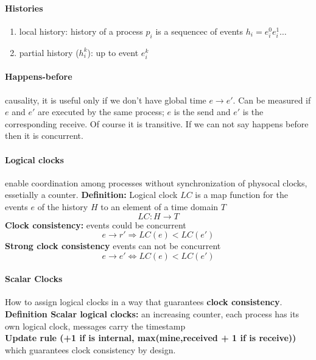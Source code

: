 \documentclass[11pt]{article}
\begin{document}
\paragraph{Histories} %
\label{par:histories}
\begin{enumerate}
	\item local history: history of a process $p_i$ is a sequencec of events $h_i = e^0_i e^1_i\ldots$
	\item partial history ($h^k_i$): up to event $e^{k}_{i}$
\end{enumerate}

\paragraph{Happens-before} %
\label{par:happens_before}
causality, it is useful only if we don't have global time $e \rightarrow e'$. Can be measured if $e$ and $e'$ are executed by the same process; $e$ is the send and $e'$ is the corresponding receive. Of course it is transitive. If we can not say happens before then it is concurrent.

\paragraph{Logical clocks} %
\label{par:logical_clocks}
enable coordination among processes without synchronization of physocal clocks, essetially a counter.
\textbf{Definition:} Logical clock $LC$ is a map function for the events $e$ of the history $H$ to an element of a time domain $T$
\[
	LC : H \rightarrow T
\]
\textbf{Clock consistency:} events could be concurrent\[
	e \rightarrow r' \Rightarrow LC(e) < LC(e')
\]
\textbf{Strong clock consistency} events can not be concurrent\[
	e \rightarrow e' \Leftrightarrow LC(e) < LC(e')
\]

\paragraph{Scalar Clocks} %
\label{par:scalar_clocks}
How to assign logical clocks in a way that guarantees \textbf{clock consistency}.\\
\textbf{Definition Scalar logical clocks:} an increasing counter, each process has its own logical clock, messages carry the timestamp\\
\textbf{Update rule (+1 if is internal, max(mine,received + 1 if is receive))} which guarantees clock consistency by design.
\end{document}
